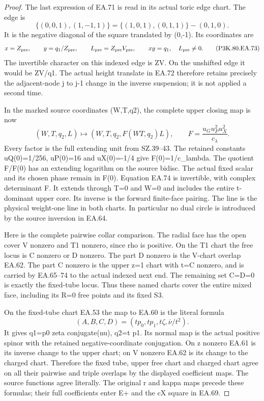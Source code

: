 \begin{proof}
The last expression of EA.71 is read in its actual
toric edge chart. The edge is
\[
 \{(0,0,1),(1,-1,1)\}
       =\{(1,0,1),(0,1,1)\}-(0,1,0).
 \tag{P3K.80.EA.72}
\]
It is the negative diagonal of the square translated
by (0,-1). Its coordinates are
\[
 x=Z_{\rm pre},\qquad y=q_1/Z_{\rm pre},\qquad
 L_{\rm pre}=Z_{\rm pre}V_{\rm pre},
 \qquad xy=q_1,\quad L_{\rm pre}\ne0.
 \tag{P3K.80.EA.73}
\]
The invertible character on this indexed edge is ZV.
On the unshifted edge it would be ZV/q1. The actual
height translate in EA.72 therefore retains precisely
the adjacent-node j to j-1 change in the inverse
suspension; it is not applied a second time.

In the marked source coordinates (W,T,q2), the
complete upper closing map is now
\[
 (W,T,q_2,L)\longmapsto
           (W,T,q_2,F(WT,q_2)L),\qquad
 F=\frac{u_Gu_P^2u_X^2}{c_\lambda}.
 \tag{P3K.80.EA.74}
\]
Every factor is the full extending unit from SZ.39--43.
The retained constants uQ(0)=1/256, uP(0)=16 and
uX(0)=-1/4 give F(0)=1/c\_lambda. The quotient
F/F(0) has an extending logarithm on the source
bidisc. The actual fixed scalar and its chosen phase
remain in F(0). Equation EA.74 is invertible, with
complex determinant F. It extends through T=0 and
W=0 and includes the entire t-dominant upper core.
Its inverse is the forward finite-face pairing.
The line is the physical weight-one line in both
charts. In particular no dual circle is introduced
by the source inversion in EA.64.

Here is the complete pairwise collar comparison.
The radial face has the open cover V nonzero and
T1 nonzero, since rho is positive. On the T1 chart
the free locus is C nonzero or D nonzero. The part
D nonzero is the V-chart overlap EA.62. The part
C nonzero is the upper z=1 chart with t=C nonzero,
and is carried by EA.65--74 to the actual indexed
next end. The remaining set C=D=0 is exactly the
fixed-tube locus. Thus these named charts cover
the entire mixed face, including its R=0 free
points and its fixed S3.

On the fixed-tube chart EA.53 the map to EA.60 is
the literal formula
\[
 (A,B,C,D)=(t p_0,t p_1,t\zeta,\overline\nu/t^2).
 \tag{P3K.80.EA.75}
\]
It gives q1=p0 zeta conjugate(nu), q2=t p1.
Its normal map is the actual positive spinor
with the retained negative-coordinate conjugation.
On z nonzero EA.61 is its inverse change to the
upper chart; on V nonzero EA.62 is its change
to the charged chart. Therefore the fixed tube,
upper free chart and charged chart agree on all
their pairwise and triple overlaps by the displayed
coefficient maps. The source functions agree
literally. The original r and kappa maps precede
these formulas; their full coefficients enter E+
and the cX square in EA.69.


\end{proof}
